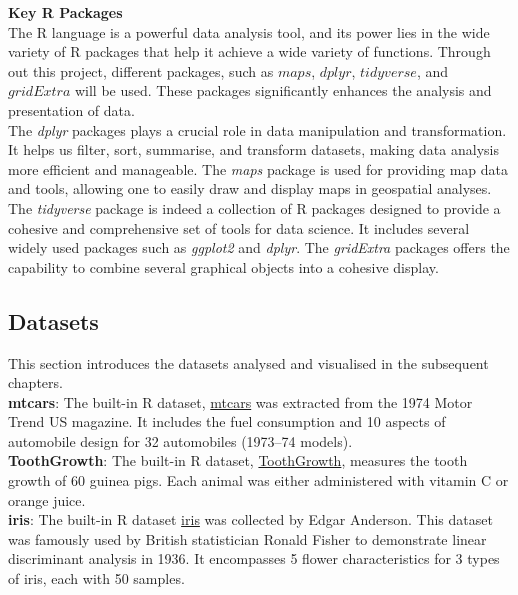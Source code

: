 \documentclass{article}\usepackage[]{graphicx}\usepackage[]{xcolor}
\numberwithin{equation}{section}
\begin{document}
\noindent\textbf{Key R Packages}\\
\noindent
The R language is a powerful data analysis tool, and its power lies in the wide variety of R packages that help it achieve a wide variety of functions. Through out this project, different packages, such as $maps$, $dplyr$, $tidyverse$, and $gridExtra$ will be used. These packages significantly enhances the analysis and presentation of data. \\

\noindent
The \textit{dplyr} packages plays a crucial role in data manipulation and transformation. It helps us filter, sort, summarise, and transform datasets, making data analysis more efficient and manageable. The \textit{maps} package is used for providing map data and tools, allowing one to easily draw and display maps in geospatial analyses. The \textit{tidyverse} package is indeed a collection of R packages designed to provide a cohesive and comprehensive set of tools for data science. It includes several widely used packages such as \textit{ggplot2} and \textit{dplyr}. The \textit{gridExtra} packages offers the capability to combine several graphical objects into a cohesive display.\\


\subsection{Datasets}
\noindent
This section introduces the datasets analysed and visualised in the subsequent chapters.\\

\noindent
\textbf{mtcars}: The built-in R dataset, \href{https://www.rdocumentation.org/packages/datasets/versions/3.6.2/topics/mtcars}{mtcars} was extracted from the 1974 Motor Trend US magazine. It includes the fuel consumption and 10 aspects of automobile design for 32 automobiles (1973–74 models). \\

\noindent
\textbf{ToothGrowth}: The built-in R dataset, \href{https://www.rdocumentation.org/packages/datasets/versions/3.6.2/topics/ToothGrowth}{ToothGrowth}, measures the tooth growth of 60 guinea pigs. Each animal was either administered with vitamin C or orange juice.\\

\noindent
\textbf{iris}: The built-in R dataset \href{https://www.rdocumentation.org/packages/datasets/versions/3.6.2/topics/iris}{iris} was collected by Edgar Anderson. This dataset was famously used by British statistician Ronald Fisher to demonstrate linear discriminant analysis in 1936. It encompasses 5 flower characteristics for 3 types of iris, each with 50 samples. \\
\end{document}
